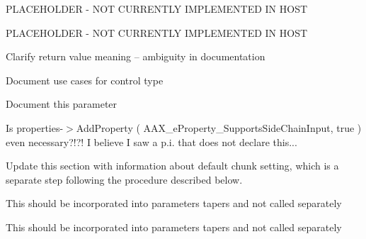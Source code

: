\begin{DoxyRefList}
%
P\+L\+A\+C\+E\+H\+O\+L\+D\+ER -\/ N\+OT C\+U\+R\+R\+E\+N\+T\+LY I\+M\+P\+L\+E\+M\+E\+N\+T\+ED IN H\+O\+ST  
\item[Member \mbox{\hyperlink{a01789_a1a654f682357d48bafd506cbbea2ae25}{A\+A\+X\+\_\+\+I\+Controller::Set\+Cycle\+Count}} (A\+A\+X\+\_\+\+E\+Property $\ast$in\+Which\+Cycle\+Counts, A\+A\+X\+\_\+\+C\+Property\+Value $\ast$i\+Values, int32\+\_\+t num\+Values)=0]\label{a00785__todo000047}%
%
P\+L\+A\+C\+E\+H\+O\+L\+D\+ER -\/ N\+OT C\+U\+R\+R\+E\+N\+T\+LY I\+M\+P\+L\+E\+M\+E\+N\+T\+ED IN H\+O\+ST  
\item[Member \mbox{\hyperlink{a01809_a44981285d022e5ddee41d903eed68a7d}{A\+A\+X\+\_\+\+I\+Dma::Is\+Transfer\+Complete}} ()=0]\label{a00785__todo000048}%
%
Clarify return value meaning -- ambiguity in documentation 
\item[Member \mbox{\hyperlink{a01857_a0c096b4092b2146d9aa0413bceeaac48}{A\+A\+X\+\_\+\+I\+Parameter::Get\+Type}} () const =0]\label{a00785__todo000049}%
%
Document use cases for control type  
\item[Member \mbox{\hyperlink{a01857_a809a5c7f712ed2e5c55e30b6d5557c59}{A\+A\+X\+\_\+\+I\+Parameter::Set\+Taper\+Delegate}} (\mbox{\hyperlink{a01877}{A\+A\+X\+\_\+\+I\+Taper\+Delegate\+Base}} \&in\+Taper\+Delegate, bool in\+Preserve\+Value)=0]\label{a00785__todo000050}%
%
Document this parameter  
\item[Module \mbox{\hyperlink{a00808}{additional\+Features\+\_\+\+Sidechain}} ]\label{a00785__todo000001}%
%
Is properties-\/$>$Add\+Property ( A\+A\+X\+\_\+e\+Property\+\_\+\+Supports\+Side\+Chain\+Input, true ) even necessary?!?! I believe I saw a p.\+i. that does not declare this... 
\item[Module \mbox{\hyperlink{a00823}{advanced\+Topics\+\_\+parameter\+Updates\+\_\+sequences}} ]\label{a00785__todo000002}%
%
Update this section with information about default chunk setting, which is a separate step following the procedure described below. 
\item[Member \mbox{\hyperlink{a00449_a596d5ea393d43f6f798a838aefe3cecd}{D\+B\+To\+Gain}} (double dB)]\label{a00785__todo000017}%
%
This should be incorporated into parameters\textquotesingle{} tapers and not called separately  
\item[Member \mbox{\hyperlink{a00449_a76f29f12e35c093e5c198b8d0e27b6f9}{Gain\+To\+DB}} (double a\+Gain)]\label{a00785__todo000016}%
%
This should be incorporated into parameters\textquotesingle{} tapers and not called separately 
\end{DoxyRefList}